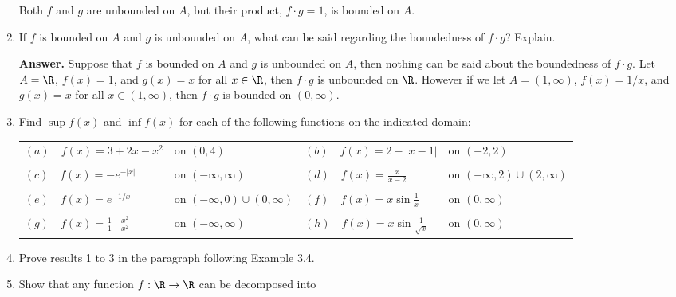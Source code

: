 \begin{enumerate}
      Both $f$ and $g$ are unbounded on $A$, but their product, $f \cdot g = 1$,
      is bounded on $A$.
   \item If $f$ is bounded on $A$ and $g$ is unbounded on $A$, what can be said
         regarding the boundedness of $f \cdot g$? Explain.
			
		\textbf{Answer.} Suppose that $f$ is bounded on $A$ and $g$ is unbounded
		on $A$, then nothing can be said about the boundedness of $f \cdot g$. Let
		$A = \R$, $f(x) = 1$, and $g(x) = x$ for all $x \in \R$, then $f \cdot g$
		is unbounded on $\R$. However if we let $A = (1, \infty)$, $f(x) = 1/x$,
		and $g(x) = x$ for all $x \in (1, \infty)$, then $f \cdot g$ is bounded on
		$(0, \infty)$. 
   \item Find $\sup f(x)$ and $\inf f(x)$ for each of the following functions on
         the indicated domain:
         \begin{center}
            \begin{tabular}{@{}llll@{}}
               $(a)\quad f(x) = 3 + 2x - x^2$ & on $(0, 4)$ &
               $(b)\quad f(x) = 2 - |x - 1|$ & on 
               $(-2, 2)$ \\ \\
               $(c)\quad f(x) = -e^{-|x|}$ & on $(-\infty, \infty)$ &
               $(d)\quad f(x) = \displaystyle\frac{x}{x - 2}$ 
               & on $(-\infty, 2) \cup (2, \infty)$ \\ \\
               $(e)\quad f(x) = e^{-1/x}$ & on $(-\infty, 0) \cup (0, \infty)$ &
               $(f)\quad f(x) = x\sin\displaystyle\frac{1}{x}$ & on 
               $(0, \infty)$ \\ \\
               $(g)\quad f(x) = \displaystyle\frac{1-x^2}{1+x^2}$ & on 
               $(-\infty, \infty)$ &
               $(h)\quad f(x) = x\sin\displaystyle\frac{1}{\sqrt{x}}$ & on 
               $(0, \infty)$
            \end{tabular}
         \end{center}
   \item Prove results 1 to 3 in the paragraph following Example 3.4.
   \item Show that any function $f : \R \rightarrow \R$ can be decomposed into

\end{enumerate}
